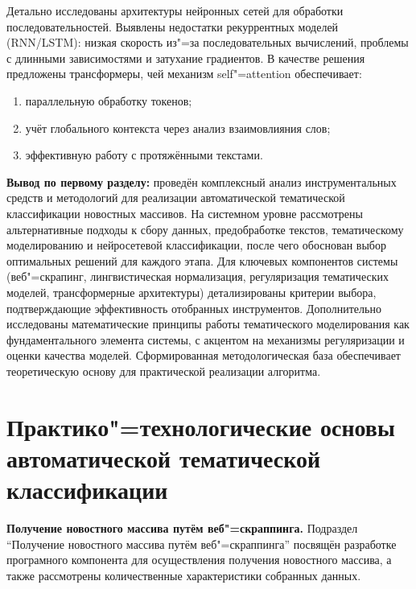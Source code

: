 \documentclass[autoref]{SCWorks}
\begin{document}
Детально исследованы архитектуры нейронных сетей для обработки
последовательностей. Выявлены недостатки рекуррентных моделей (RNN/LSTM):
низкая скорость из"=за последовательных вычислений, проблемы с длинными
зависимостями и затухание градиентов. В качестве решения предложены
трансформеры, чей механизм self"=attention обеспечивает:

\begin{enumerate}
    \item параллельную обработку токенов;
    \item учёт глобального контекста через анализ взаимовлияния слов;
    \item эффективную работу с протяжёнными текстами.
\end{enumerate}

\textbf{Вывод по первому разделу:} проведён комплексный анализ инструментальных
средств и методологий для реализации автоматической тематической классификации
новостных массивов. На системном уровне рассмотрены альтернативные подходы к
сбору данных, предобработке текстов, тематическому моделированию и нейросетевой
классификации, после чего обоснован выбор оптимальных решений для каждого этапа.
Для ключевых компонентов системы (веб"=скрапинг, лингвистическая нормализация,
регуляризация тематических моделей, трансформерные архитектуры) детализированы
критерии выбора, подтверждающие эффективность отобранных инструментов.
Дополнительно исследованы математические принципы работы тематического
моделирования как фундаментального элемента системы, с акцентом на механизмы
регуляризации и оценки качества моделей. Сформированная методологическая база
обеспечивает теоретическую основу для практической реализации алгоритма.

\section{Практико"=технологические основы автоматической тематической
классификации}

\textbf{Получение новостного массива путём веб"=скраппинга.}
Подраздел \enquote{Получение новостного массива путём веб"=скраппинга} посвящён
разработке програмного компонента для осуществления получения новостного
массива, а также рассмотрены количественные характеристики собранных данных.
\end{document}
